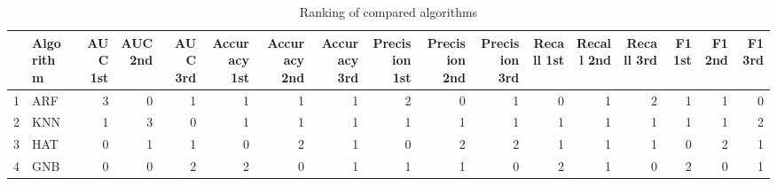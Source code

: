 \begin{table}
\footnotesize
\caption{Ranking of compared algorithms}
\label{tab:places}
\begin{tabular}{llrrrrrrrrrrrrrrr}
\hline
 & Algorithm & AUC 1st & AUC 2nd & AUC 3rd & Accuracy 1st & Accuracy 2nd & Accuracy 3rd & Precision 1st & Precision 2nd & Precision 3rd & Recall 1st & Recall 2nd & Recall 3rd & F1 1st & F1 2nd & F1 3rd \\
\hline
1 & ARF & 3 & 0 & 1 & 1 & 1 & 1 & 2 & 0 & 1 & 0 & 1 & 2 & 1 & 1 & 0 \\
2 & KNN & 1 & 3 & 0 & 1 & 1 & 1 & 1 & 1 & 1 & 1 & 1 & 1 & 1 & 1 & 2 \\
3 & HAT & 0 & 1 & 1 & 0 & 2 & 1 & 0 & 2 & 2 & 1 & 1 & 1 & 0 & 2 & 1 \\
4 & GNB & 0 & 0 & 2 & 2 & 0 & 1 & 1 & 1 & 0 & 2 & 1 & 0 & 2 & 0 & 1 \\
\hline
\end{tabular}
\end{table}
